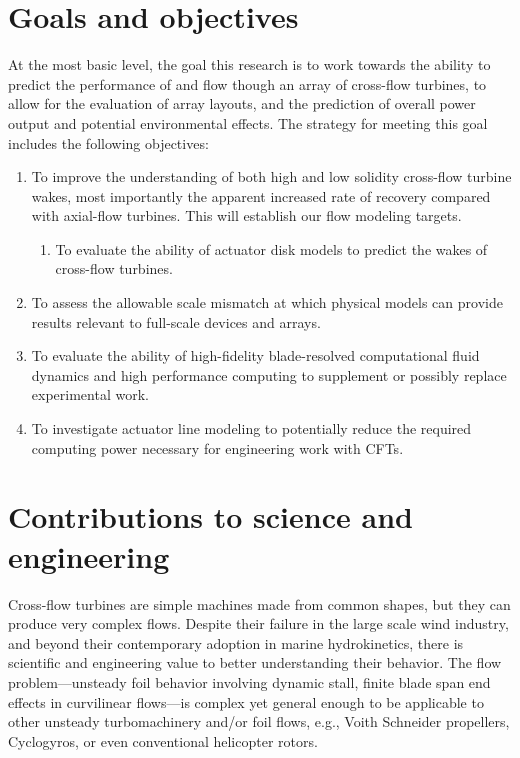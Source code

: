 \section{Goals and objectives}

At the most basic level, the goal this research is to work towards the ability
to predict the performance of and flow though an array of cross-flow turbines,
to allow for the evaluation of array layouts, and the prediction of overall
power output and potential environmental effects. The strategy for meeting this
goal includes the following objectives:

\begin{enumerate}
	\item To improve the understanding of both high and low solidity cross-flow
    turbine wakes, most importantly the apparent increased rate of recovery
    compared with axial-flow turbines. This will establish our flow modeling
    targets.
    
    \begin{enumerate}
        \item To evaluate the ability of actuator disk models to predict the
        wakes of cross-flow turbines.
    \end{enumerate}
	
	\item To assess the allowable scale mismatch at which physical models can
	provide results relevant to full-scale devices and arrays.
	
	\item To evaluate the ability of high-fidelity blade-resolved computational
    fluid dynamics and high performance computing to supplement or possibly replace
    experimental work.
    
    \item To investigate actuator line modeling to potentially reduce the
    required computing power necessary for engineering work with CFTs.
\end{enumerate}


\section{Contributions to science and engineering}

Cross-flow turbines are simple machines made from common shapes, but they can
produce very complex flows. Despite their failure in the large scale wind
industry, and beyond their contemporary adoption in marine hydrokinetics, there
is scientific and engineering value to better understanding their behavior. The
flow problem---unsteady foil behavior involving dynamic stall, finite blade span
end effects in curvilinear flows---is complex yet general enough to be
applicable to other unsteady turbomachinery and/or foil flows, e.g., Voith
Schneider propellers, Cyclogyros, or even conventional helicopter rotors.

